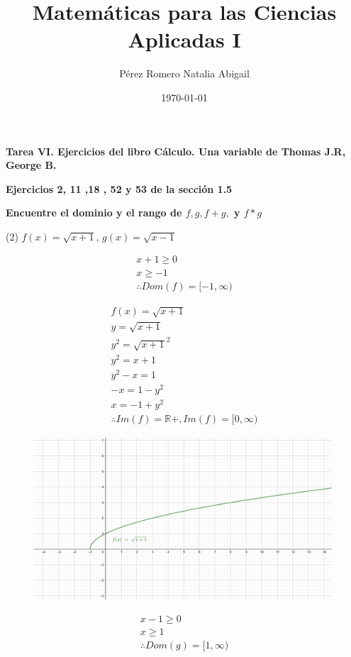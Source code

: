 \documentclass[12pt, letterpaper]{article}
\title{Matemáticas para las Ciencias Aplicadas I}
\author{Pérez Romero Natalia Abigail}
\date{\today}
\begin{document}
\maketitle
\textbf{Tarea VI. Ejercicios del libro Cálculo. Una variable de Thomas J.R, George B.}

\textbf{Ejercicios 2, 11 ,18 , 52 y 53 de la sección 1.5}

\textbf{Encuentre el dominio y el rango de $f, g, f+g,$ y $f * g$ }


(2) $f(x) = \sqrt{x+1}$, $g(x)= \sqrt{x-1}$

\begin{align*}
	x+1  \geq 0\\
	x \geq -1\\
	\therefore Dom(f) = [-1, \infty)
\end{align*}

\begin{align*}
	f(x) = \sqrt{x+1}\\
	 y = \sqrt{x+1}\\
	y^2 = {\sqrt{x+1}}^2\\
	y^2 = x+1\\
	y^2 -x = 1\\
	-x = 1- y^2\\
	x = -1+ y^2\\
	\therefore Im(f) = \mathbb{R}+, Im(f) = [0, \infty)
\end{align*}

\begin{figure}[h]
\centering
\includegraphics[width=30em]{t6uno}
\end{figure}

\newpage

\begin{align*}
	x-1  \geq 0\\
	x \geq 1\\
	\therefore Dom(g) = [1, \infty)
\end{align*}
\end{document}

